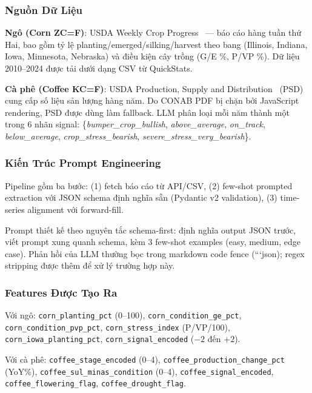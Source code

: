 \subsubsection{Nguồn Dữ Liệu}

\textbf{Ngô (Corn ZC=F)}: USDA Weekly Crop Progress~\cite{usda2026quickstats} —
báo cáo hàng tuần thứ Hai, bao gồm tỷ lệ planting/emerged/silking/harvest
theo bang (Illinois, Indiana, Iowa, Minnesota, Nebraska) và điều kiện cây trồng
(G/E \%, P/VP \%). Dữ liệu 2010--2024 được tải dưới dạng CSV từ QuickStats.

\textbf{Cà phê (Coffee KC=F)}: USDA Production, Supply and Distribution~\cite{usda2026psd}
(PSD) cung cấp số liệu sản lượng hàng năm. Do CONAB PDF bị chặn bởi JavaScript
rendering, PSD được dùng làm fallback. LLM phân loại mỗi năm thành một trong 6
nhãn signal: \{\textit{bumper\_crop\_bullish}, \textit{above\_average},
\textit{on\_track}, \textit{below\_average}, \textit{crop\_stress\_bearish},
\textit{severe\_stress\_very\_bearish}\}.

\subsubsection{Kiến Trúc Prompt Engineering}

Pipeline gồm ba bước: (1) fetch báo cáo từ API/CSV,
(2) few-shot prompted extraction với JSON schema định nghĩa sẵn (Pydantic v2
validation), (3) time-series alignment với forward-fill.

Prompt thiết kế theo nguyên tắc schema-first: định nghĩa output JSON trước,
viết prompt xung quanh schema, kèm 3 few-shot examples (easy, medium, edge case).
Phản hồi của LLM thường bọc trong markdown code fence (```json);
regex stripping được thêm để xử lý trường hợp này.

\subsubsection{Features Được Tạo Ra}

Với ngô: \texttt{corn\_planting\_pct} (0--100), \texttt{corn\_condition\_ge\_pct},
\texttt{corn\_condition\_pvp\_pct}, \texttt{corn\_stress\_index} (P/VP/100),
\texttt{corn\_iowa\_planting\_pct}, \texttt{corn\_signal\_encoded} ($-2$ đến $+2$).

Với cà phê: \texttt{coffee\_stage\_encoded} (0--4), \texttt{coffee\_production\_change\_pct}
(YoY\%), \texttt{coffee\_sul\_minas\_condition} (0--4), \texttt{coffee\_signal\_encoded},
\texttt{coffee\_flowering\_flag}, \texttt{coffee\_drought\_flag}.

